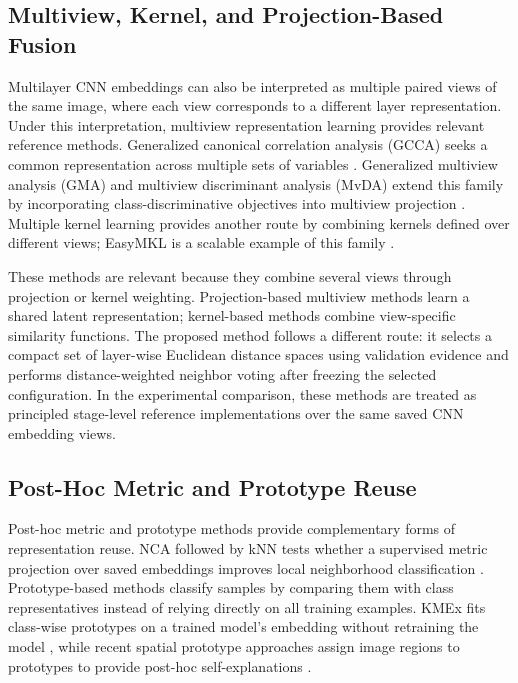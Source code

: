 \documentclass[main.tex]{subfiles}
\begin{document}
\subsection{Multiview, Kernel, and Projection-Based Fusion}

Multilayer CNN embeddings can also be interpreted as multiple paired views of the same image, where each view corresponds to a different layer representation. Under this interpretation, multiview representation learning provides relevant reference methods. Generalized canonical correlation analysis (GCCA) seeks a common representation across multiple sets of variables \cite{carroll1968gca,kettenring1971canonical}. Generalized multiview analysis (GMA) and multiview discriminant analysis (MvDA) extend this family by incorporating class-discriminative objectives into multiview projection \cite{sharma2012gma,kan2016mvda}. Multiple kernel learning provides another route by combining kernels defined over different views; EasyMKL is a scalable example of this family \cite{aiolli2015easymkl}.

These methods are relevant because they combine several views through projection or kernel weighting. Projection-based multiview methods learn a shared latent representation; kernel-based methods combine view-specific similarity functions. The proposed method follows a different route: it selects a compact set of layer-wise Euclidean distance spaces using validation evidence and performs distance-weighted neighbor voting after freezing the selected configuration. In the experimental comparison, these methods are treated as principled stage-level reference implementations over the same saved CNN embedding views.

\subsection{Post-Hoc Metric and Prototype Reuse}

Post-hoc metric and prototype methods provide complementary forms of representation reuse. NCA followed by kNN tests whether a supervised metric projection over saved embeddings improves local neighborhood classification \cite{goldberger2004nca}. Prototype-based methods classify samples by comparing them with class representatives instead of relying directly on all training examples. KMEx fits class-wise prototypes on a trained model's embedding without retraining the model \cite{gautam2024kmex}, while recent spatial prototype approaches assign image regions to prototypes to provide post-hoc self-explanations \cite{boubekki2026posthoc}.
\end{document}
